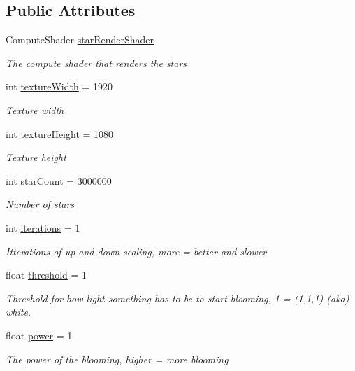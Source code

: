 \subsection*{Public Attributes}
\begin{DoxyCompactItemize}
\item 
Compute\+Shader \mbox{\hyperlink{class_star_renderer_a0dab9cfb1013e961414f542841947f14}{star\+Render\+Shader}}
\begin{DoxyCompactList}\small\item\em The compute shader that renders the stars \end{DoxyCompactList}\item 
int \mbox{\hyperlink{class_star_renderer_aa8db41c2832b85a0d769ec1d85ed5332}{texture\+Width}} = 1920
\begin{DoxyCompactList}\small\item\em Texture width \end{DoxyCompactList}\item 
int \mbox{\hyperlink{class_star_renderer_a8a1aac8f3fc4841b8e8ab9c53db856c0}{texture\+Height}} = 1080
\begin{DoxyCompactList}\small\item\em Texture height \end{DoxyCompactList}\item 
int \mbox{\hyperlink{class_star_renderer_a74b19e105edfbee2c2d7a1311112f1bf}{star\+Count}} = 3000000
\begin{DoxyCompactList}\small\item\em Number of stars \end{DoxyCompactList}\item 
int \mbox{\hyperlink{class_star_renderer_a267117fca2d5593da99457ad77b1eedc}{iterations}} = 1
\begin{DoxyCompactList}\small\item\em Itterations of up and down scaling, more = better and slower \end{DoxyCompactList}\item 
float \mbox{\hyperlink{class_star_renderer_aedb60f380d5c481c8f2b76111cc943f2}{threshold}} = 1
\begin{DoxyCompactList}\small\item\em Threshold for how light something has to be to start blooming, 1 = (1,1,1) (aka) white. \end{DoxyCompactList}\item 
float \mbox{\hyperlink{class_star_renderer_a79c1cafe6e1ac487b3480a7aa9321310}{power}} = 1
\begin{DoxyCompactList}\small\item\em The power of the blooming, higher = more blooming \end{DoxyCompactList}\item 

\end{DoxyCompactItemize}
